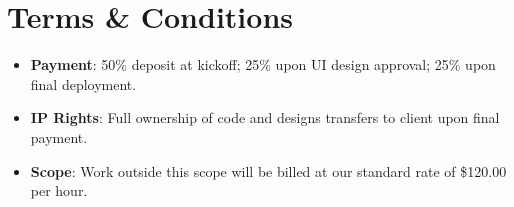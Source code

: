 \section{Terms \& Conditions}
\begin{itemize}
    \item \textbf{Payment}: 50\% deposit at kickoff; 25\% upon UI design approval; 25\% upon final deployment.
    \item \textbf{IP Rights}: Full ownership of code and designs transfers to client upon final payment.
    \item \textbf{Scope}: Work outside this scope will be billed at our standard rate of \$120.00 per hour.
\end{itemize}

\vspace{0.15in}

